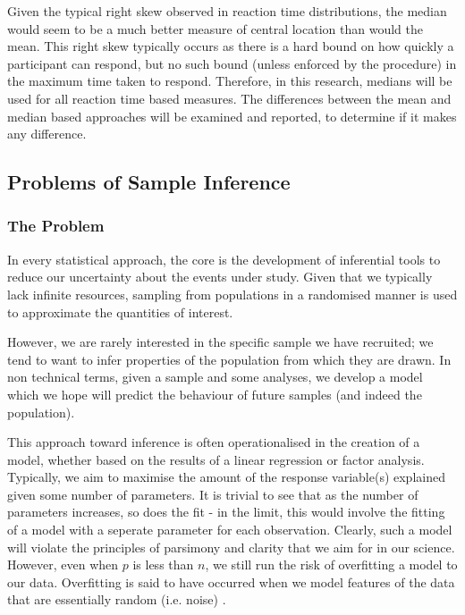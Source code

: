 Given the typical right skew observed in reaction time distributions, the median would seem to be a much better measure of central location than would the mean. This right skew typically occurs as there is a hard bound on how quickly a participant can respond, but no such bound (unless enforced by the procedure) in the maximum time taken to respond. Therefore, in this research, medians will be used for all reaction time based measures. The differences between the mean and median based approaches will be examined and reported, to determine if it makes any difference. 

\subsection{Problems of Sample Inference}
\label{sec:probl-sample-infer}
\subsubsection{The Problem}

In every statistical approach, the core is the development of inferential tools to reduce our uncertainty about the events under study\cite{gelman2010philosophy}. Given that we typically lack infinite resources, sampling from populations in a randomised manner is used to approximate the quantities of interest\cite{venables2002modern}.

However, we are rarely interested in the specific sample we have recruited; we tend to want to infer  properties of the population  from which they are drawn.  In non technical terms, given a sample and some analyses, we develop a model which we hope will predict the behaviour of future samples (and indeed the population).

This approach toward inference is often operationalised in the creation of a model, whether based on the results of a linear regression or factor analysis. Typically, we aim to maximise the amount of the response variable(s) explained given some number of parameters. It is trivial to see that as the number of parameters increases, so does the fit - in the limit, this would involve the fitting of a model with a seperate parameter for each observation. Clearly, such a model will violate the principles of parsimony and clarity that we aim for in our science. However, even when $p$ is less than $n$, we still run the risk of overfitting a model to our data. Overfitting is said to have occurred when we model features of the data that are essentially random (i.e. noise) \cite{friedman2009elements}. 

